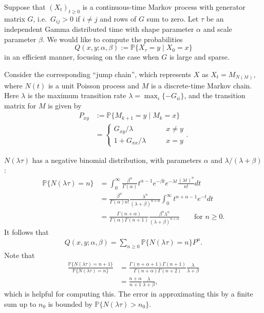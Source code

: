 \documentclass{article}
\renewcommand{\P}{\mathbb{P}}
\newcommand{\given}{\mid}
\begin{document}
Suppose that $(X_t)_{t\ge0}$ is a continuous-time Markov process with generator matrix $G$,
i.e.\ $G_{ij}>0$ if $i\neq j$ and rows of $G$ sum to zero.
Let $\tau$ be an independent Gamma distributed time with shape parameter $\alpha$ and scale parameter $\beta$.
We would like to compute the probabilities
\[
  Q(x,y;\alpha,\beta) := \P\{ X_\tau = y \given X_0 = x \} 
\]
in an efficient manner,
focusing on the case when $G$ is large and sparse.

Consider the corresponding ``jump chain'',
which represents $X$ as $X_t = M_{N(\lambda t)}$,
where $N(t)$ is a unit Poisson process and $M$ is a discrete-time Markov chain.
Here $\lambda$ is the maximum transition rate $\lambda = \max_i \{ - G_{ii} \}$,
and the transition matrix for $M$ is given by
\begin{align}
    P_{xy} &:= \P\{M_{k+1} = y \given M_k = x\} \\
        &= \begin{cases}  
                G_{xy}/\lambda \qquad & x\neq y \\
                1+G_{xx}/\lambda \qquad & x=y 
            \end{cases} .
\end{align}

$N(\lambda \tau)$ has a negative binomial distribution, with parameters $\alpha$ and $\lambda/(\lambda+\beta)$:
\begin{align}
  \P\{ N(\lambda \tau) = n \} &= \int_0^\infty \frac{ \beta^\alpha }{\Gamma(\alpha)} t^{\alpha-1} e^{-\beta t} e^{-\lambda t} \frac{ (\lambda t)^n }{ n! } dt \\
  &= \frac{ \beta^\alpha }{ \Gamma(\alpha) n! } \frac{\lambda^n}{(\lambda+\beta)^{n+\alpha}} \int_0^\infty t^{n+\alpha-1} e^{-t} dt \\
  &= \frac{ \Gamma(n+\alpha) }{ \Gamma(\alpha) \Gamma(n+1) } \frac{ \beta^\alpha \lambda^n }{(\lambda+\beta)^{n+\alpha}}\qquad \text{for } n \ge 0 .
\end{align}
It follows that
\begin{align}
    Q(x,y;\alpha,\beta) = \sum_{n \ge 0} \P\{ N(\lambda \tau) = n \} P^n  .
\end{align}
Note that 
\begin{align}
  \frac{ \P\{ N(\lambda \tau) = n+1 \} }{ \P\{ N(\lambda \tau) = n \} } &= \frac{ \Gamma(n+\alpha+1) \Gamma(n+1) }{ \Gamma(n+\alpha) \Gamma(n+2) } \frac{\lambda}{\lambda+\beta} \\
  &= \frac{ n+\alpha }{ n+1 } \frac{\lambda}{\lambda+\beta} ,
\end{align}
which is helpful for computing this.
The error in approximating this by a finite sum up to $n_0$ is bounded by $\P\{N(\lambda \tau)>n_0\}$.
\end{document}
